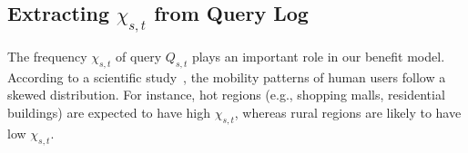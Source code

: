 \documentclass{sig-alternate}
\newcommand{\spath}{SP\xspace}
\begin{document}
%









\subsection{Extracting {\Large $\chi_{s,t}$} from Query Log}\label{sec:extract}
%
The frequency $\chi_{s,t}$ of query $Q_{s,t}$ plays an important role in our benefit model.
According to a scientific study~\cite{nature}, the mobility patterns of human users follow a
skewed distribution.
For instance, hot regions (e.g., shopping malls, residential buildings) are expected to have high $\chi_{s,t}$,
whereas rural regions are likely to have low $\chi_{s,t}$.
\end{document}
